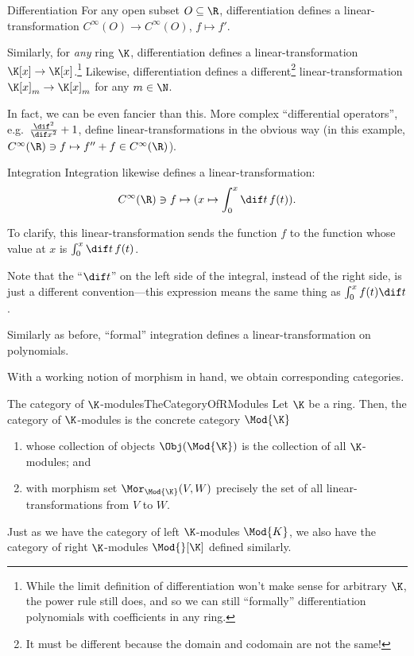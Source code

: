 \begin{exm}{Differentiation}{}
	For any open subset $O\subseteq \R$, differentiation defines a linear-transformation $C^{\infty}(O)\rightarrow C^{\infty}(O)$, $f\mapsto f'$.
	
	Similarly, for \emph{any} ring $\K$, differentiation defines a linear-transformation $\K [x]\rightarrow \K [x]$.\footnote{While the limit definition of differentiation won't make sense for arbitrary $\K$, the power rule still does, and so we can still ``formally'' differentiation polynomials with coefficients in any ring.}  Likewise, differentiation defines a different\footnote{It must be different because the domain and codomain are not the same!} linear-transformation $\K [x]_m\rightarrow \K [x]_m$ for any $m\in \N$.
	
	In fact, we can be even fancier than this.  More complex ``differential operators'', e.g.~$\frac{\dif ^2}{\dif x^2}+1$, define linear-transformations in the obvious way (in this example, $C^{\infty}(\R )\ni f\mapsto f''+f\in C^{\infty}(\R )$).
\end{exm}
\begin{exm}{Integration}{}
	Integration likewise defines a linear-transformation:
	\begin{equation}
		C^{\infty}(\R )\ni f\mapsto (x\mapsto \int _0^x\dif t\, f(t)).
	\end{equation}
	\begin{rmk}
		To clarify, this linear-transformation sends the function $f$ to the function whose value at $x$ is $\int _0^x\dif t\, f(t)$.
	\end{rmk}
	\begin{rmk}
		Note that the ``$\dif t$'' on the left side of the integral, instead of the right side, is just a different convention---this expression means the same thing as $\int _0^xf(t)\dif t$.
	\end{rmk}

	Similarly as before, ``formal'' integration defines a linear-transformation on polynomials.
\end{exm}
With a working notion of morphism in hand, we obtain corresponding categories.
\begin{exm}{The category of $\K$-modules}{TheCategoryOfRModules}
	Let $\K$ be a ring.  Then, the category of $\K$-modules is the concrete category $\Mod{\K}$\index[notation]{$\Mod{\K}$}
	\begin{enumerate}
		\item whose collection of objects $\Obj (\Mod{\K})$ is the collection of all $\K$-modules; and
		\item with morphism set $\Mor _{\Mod{\K}}(V,W)$ precisely the set of all linear-transformations from $V$ to $W$.
	\end{enumerate}
	\begin{rmk}
		Just as we have the category of left $\K$-modules $\Mod{K}$, we also have the category of right $\K$-modules $\Mod{}[\K]$\index[notation]{$\Mod*{\K}$} defined similarly.
	\end{rmk}
\end{exm}
